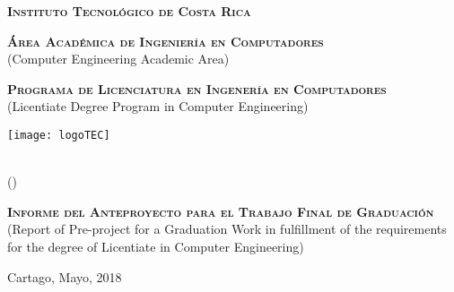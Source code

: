 
\thispagestyle{empty} 

\begin{center}

\textsc{\large \textbf{Instituto Tecnol\'ogico de Costa Rica}} \\
\par\vspace{7mm}


\textsc{\large \textbf{\'Area Acad\'emica de Ingenier\'ia en Computadores}}\\
(Computer Engineering Academic Area)\\
\par\vspace{7mm}

\textsc{\large \textbf{Programa de Licenciatura en Ingener\'ia en Computadores}}\\
(Licentiate Degree Program in Computer Engineering)



\par\vspace{20mm}

\texttt{[image: logoTEC]}

\par\vspace*{\fill}

{\LARGE\bf{\textsf{ \Large \scriptTitle}}}\\
(\scriptEnglishTitle)

\par\vspace*{\fill}

\textsc{\large \textbf{Informe del Anteproyecto para el Trabajo Final de Graduaci\'on}}\\
(Report of Pre-project for a Graduation Work in fulfillment of the requirements for the degree of 
Licentiate in Computer Engineering)

\par\vspace*{\fill}


\textsc{\large\bf \scriptAuthor}

\vspace*{\fill}

{Cartago, Mayo, 2018}

\end{center}
\newpage 
\cleardoublepage  
